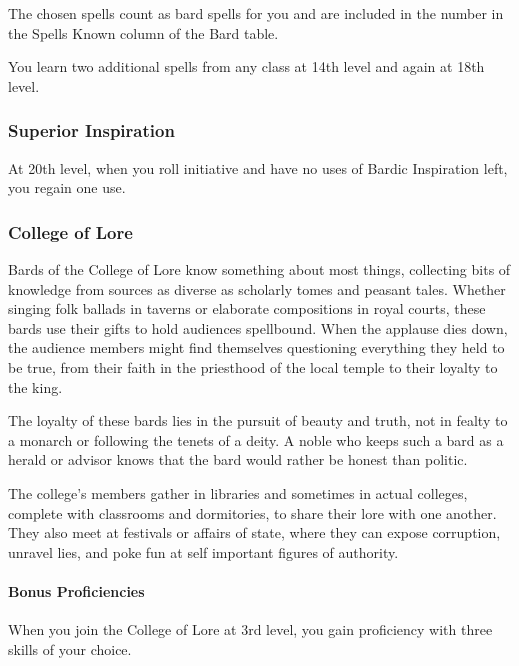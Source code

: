 The chosen spells count as bard spells for you and are included in the
number in the Spells Known column of the Bard table.

You learn two additional spells from any class at 14th level and again
at 18th level.

\hypertarget{superior-inspiration}{%
\subsubsection{Superior Inspiration}\label{superior-inspiration}}

At 20th level, when you roll initiative and have no uses of Bardic
Inspiration left, you regain one use.

\hypertarget{college-of-lore}{%
\subsubsection{College of Lore}\label{college-of-lore}}

Bards of the College of Lore know something about most things,
collecting bits of knowledge from sources as diverse as scholarly tomes
and peasant tales. Whether singing folk ballads in taverns or elaborate
compositions in royal courts, these bards use their gifts to hold
audiences spellbound. When the applause dies down, the audience members
might find themselves questioning everything they held to be true, from
their faith in the priesthood of the local temple to their loyalty to
the king.

The loyalty of these bards lies in the pursuit of beauty and truth, not
in fealty to a monarch or following the tenets of a deity. A noble who
keeps such a bard as a herald or advisor knows that the bard would
rather be honest than politic.

The college's members gather in libraries and sometimes in actual
colleges, complete with classrooms and dormitories, to share their lore
with one another. They also meet at festivals or affairs of state, where
they can expose corruption, unravel lies, and poke fun at self important
figures of authority.

\hypertarget{bonus-proficiencies}{%
\paragraph{Bonus Proficiencies}\label{bonus-proficiencies}}

When you join the College of Lore at 3rd level, you gain proficiency
with three skills of your choice.

